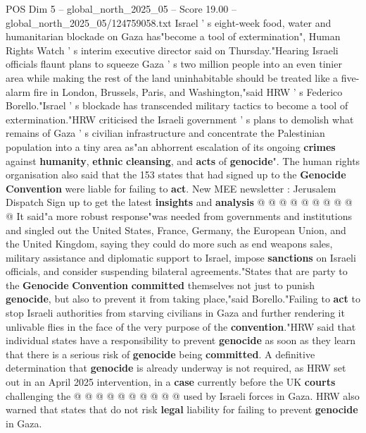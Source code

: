 \begin{textsample}{POS Dim 5 – global\_north\_2025\_05 – Score 19.00 – global\_north\_2025\_05/124759058.txt}  \label{ex:f5_pos_076}
Israel ' s eight-week food, water and humanitarian blockade on Gaza has"become a tool of extermination", Human Rights Watch ' s interim executive director said on Thursday."Hearing Israeli officials flaunt plans to squeeze Gaza ' s two million people into an even tinier area while making the rest of the land uninhabitable should be treated like a five-alarm fire in London, Brussels, Paris, and Washington,"said HRW ' s Federico Borello."Israel ' s blockade has transcended military tactics to become a tool of extermination."HRW criticised the Israeli government ' s plans to demolish what remains of Gaza ' s civilian infrastructure and concentrate the Palestinian population into a tiny area as"an abhorrent escalation of its ongoing \textbf{crimes} against \textbf{humanity}, \textbf{ethnic} \textbf{cleansing}, and \textbf{acts} of \textbf{genocide}".
The human rights organisation also said that the 153 states that had signed up to the \textbf{Genocide} \textbf{Convention} were liable for failing to \textbf{act}.
New MEE newsletter : Jerusalem Dispatch Sign up to get the latest \textbf{insights} and \textbf{analysis} @ @ @ @ @ @ @ @ @ @ It said"a more robust response"was needed from governments and institutions and singled out the United States, France, Germany, the European Union, and the United Kingdom, saying they could do more such as end weapons sales, military assistance and diplomatic support to Israel, impose \textbf{sanctions} on Israeli officials, and consider suspending bilateral agreements."States that are party to the \textbf{Genocide} \textbf{Convention} \textbf{committed} themselves not just to punish \textbf{genocide}, but also to prevent it from taking place,"said Borello."Failing to \textbf{act} to stop Israeli authorities from starving civilians in Gaza and further rendering it unlivable flies in the face of the very purpose of the \textbf{convention}."HRW said that individual states have a responsibility to prevent \textbf{genocide} as soon as they learn that there is a serious risk of \textbf{genocide} being \textbf{committed}.
A definitive determination that \textbf{genocide} is already underway is not required, as HRW set out in an April 2025 intervention, in a \textbf{case} currently before the UK \textbf{courts} challenging the @ @ @ @ @ @ @ @ @ @ used by Israeli forces in Gaza.
HRW also warned that states that do not risk \textbf{legal} liability for failing to prevent \textbf{genocide} in Gaza.

\end{textsample}
